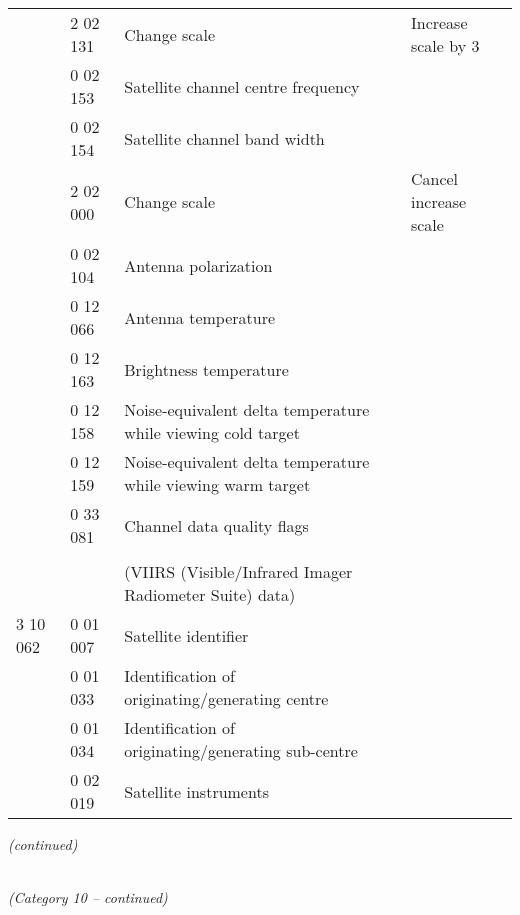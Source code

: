 \begin{longtable}[]{@{}llll@{}}
& 2 02 131 & Change scale & Increase scale by 3\tabularnewline
& 0 02 153 & Satellite channel centre frequency &\tabularnewline
& 0 02 154 & Satellite channel band width &\tabularnewline
& 2 02 000 & Change scale & Cancel increase scale\tabularnewline
& 0 02 104 & Antenna polarization &\tabularnewline
& 0 12 066 & Antenna temperature &\tabularnewline
& 0 12 163 & Brightness temperature &\tabularnewline
& 0 12 158 & Noise-equivalent delta temperature while viewing cold target &\tabularnewline
& 0 12 159 & Noise-equivalent delta temperature while viewing warm target &\tabularnewline
& 0 33 081 & Channel data quality flags &\tabularnewline
& & &\tabularnewline
& & (VIIRS (Visible/Infrared Imager Radiometer Suite) data) &\tabularnewline
3 10 062 & 0 01 007 & Satellite identifier &\tabularnewline
& 0 01 033 & Identification of originating/generating centre &\tabularnewline
& 0 01 034 & Identification of originating/generating sub-centre &\tabularnewline
& 0 02 019 & Satellite instruments &\tabularnewline
\bottomrule
\end{longtable}

\emph{(continued)}

\emph{\\
(Category 10 -- continued)}

